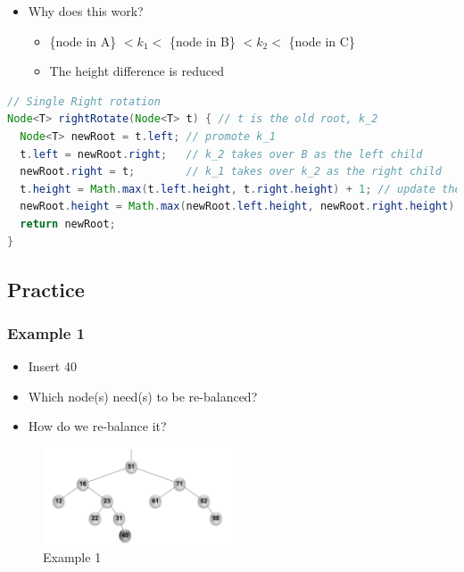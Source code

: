 \documentclass[
  10pt,
  english,
  letterpaper,
,tablecaptionabove
]{scrartcl}
\providecommand{\tightlist}{%
  \setlength{\itemsep}{0pt}\setlength{\parskip}{0pt}}
\begin{document}
\begin{itemize}
\tightlist
\item
  Why does this work?

  \begin{itemize}
  \tightlist
  \item
    \{node in A\} \(< k_1 <\) \{node in B\} \(< k_2 <\) \{node in C\}
  \item
    The height difference is reduced
  \end{itemize}
\end{itemize}

\begin{lstlisting}[language=Java]
// Single Right rotation
Node<T> rightRotate(Node<T> t) { // t is the old root, k_2
  Node<T> newRoot = t.left; // promote k_1
  t.left = newRoot.right;   // k_2 takes over B as the left child
  newRoot.right = t;        // k_1 takes over k_2 as the right child
  t.height = Math.max(t.left.height, t.right.height) + 1; // update the height
  newRoot.height = Math.max(newRoot.left.height, newRoot.right.height) + 1;
  return newRoot;
}
\end{lstlisting}

\hypertarget{practice}{%
\subsection{Practice}\label{practice}}

\hypertarget{example-1}{%
\subsubsection{Example 1}\label{example-1}}

\begin{itemize}
\tightlist
\item
  Insert 40
\item
  Which node(s) need(s) to be re-balanced?
\item
  How do we re-balance it?
\end{itemize}

\begin{figure}
\centering
\includegraphics[width=0.5\textwidth,height=\textheight]{images/7.png}
\caption{Example 1}
\end{figure}
\end{document}
